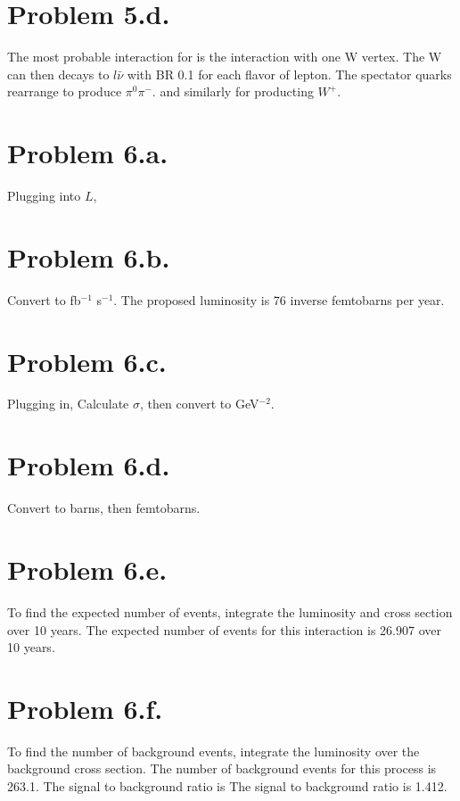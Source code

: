 \documentclass{article}
\begin{document}
\section*{Problem 5.d.}
The most probable interaction for
is the interaction with one W vertex. The W can then decays to $l \bar{\nu}$ with BR 0.1 for each flavor of lepton. The spectator quarks rearrange to produce $\pi^0 \pi^-$. 
and similarly for producting $W^+$.
\section*{Problem 6.a.}
Plugging into $L$,
\section*{Problem 6.b.}
Convert to fb$^{-1}$ s$^{-1}$.
The proposed luminosity is 76 inverse femtobarns per year.
\section*{Problem 6.c.}
Plugging in,
Calculate $\sigma$, then convert to GeV$^{-2}$.
\section*{Problem 6.d.}
Convert to barns, then femtobarns.
\section*{Problem 6.e.}
To find the expected number of events, integrate the luminosity and cross section over 10 years.
The expected number of events for this interaction is 26.907 over 10 years.
\section*{Problem 6.f.}
To find the number of background events, integrate the luminosity over the background cross section.
The number of background events for this process is 263.1. The signal to background ratio is
The signal to background ratio is 1.412.
\printbibliography
\end{document}
